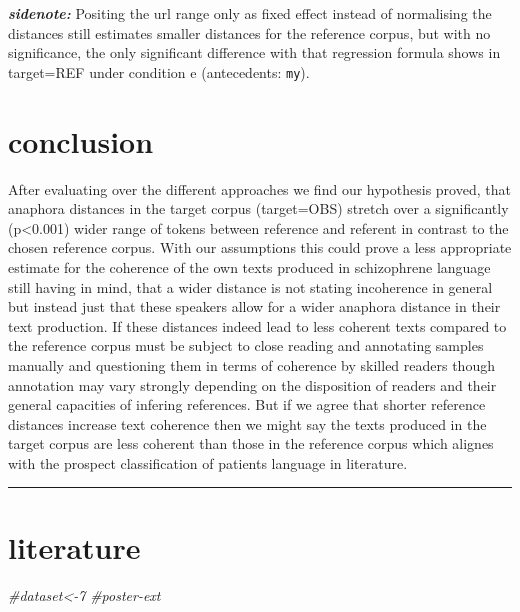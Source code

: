 \documentclass[
  12pt,
  oneside]{book}
\newenvironment{Shaded}{\begin{snugshade}}{\end{snugshade}}
\newcommand{\CommentTok}[1]{\textcolor[rgb]{0.56,0.35,0.01}{\textit{#1}}}
\begin{document}
\textbf{\emph{sidenote:}} Positing the url range only as fixed effect instead of normalising the distances still estimates smaller distances for the reference corpus, but with no significance, the only significant difference with that regression formula shows in target=REF under condition e (antecedents: \texttt{my}).

\section{conclusion}\label{conclusion}

After evaluating over the different approaches we find our hypothesis proved, that anaphora distances in the target corpus (target=OBS) stretch over a significantly (p\textless0.001) wider range of tokens between reference and referent in contrast to the chosen reference corpus. With our assumptions this could prove a less appropriate estimate for the coherence of the own texts produced in schizophrene language still having in mind, that a wider distance is not stating incoherence in general but instead just that these speakers allow for a wider anaphora distance in their text production. If these distances indeed lead to less coherent texts compared to the reference corpus must be subject to close reading and annotating samples manually and questioning them in terms of coherence by skilled readers though annotation may vary strongly depending on the disposition of readers and their general capacities of infering references. But if we agree that shorter reference distances increase text coherence then we might say the texts produced in the target corpus are less coherent than those in the reference corpus which alignes with the prospect classification of patients language in literature.

\begin{center}\rule{0.5\linewidth}{0.5pt}\end{center}

\section{literature}\label{literature}

\begin{Shaded}
\begin{Highlighting}[]
\CommentTok{\#dataset\textless{}{-}7}
\CommentTok{\#poster{-}ext}
\end{Highlighting}
\end{Shaded}
\end{document}
